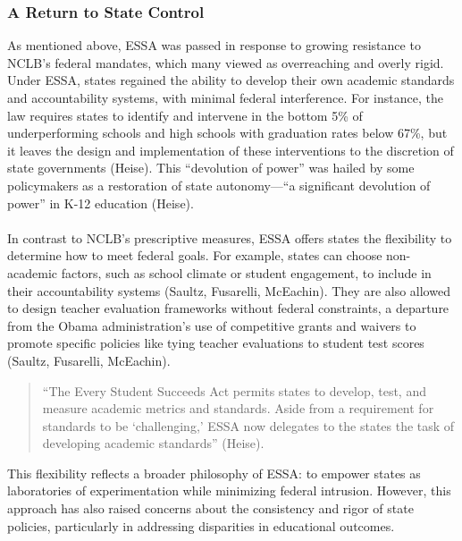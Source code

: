 \documentclass[11pt]{extarticle}
\begin{document}
\subsubsection{A Return to State Control}
As mentioned above, ESSA was passed in response to growing resistance to NCLB’s federal mandates, which many viewed as overreaching and overly rigid. 
Under ESSA, states regained the ability to develop their own academic standards and accountability systems, with minimal federal interference. 
For instance, the law requires states to identify and intervene in the bottom 5\% of underperforming schools and high schools with graduation rates below 67\%, but it leaves the design and implementation of these interventions to the discretion of state governments (Heise). 
This “devolution of power” was hailed by some policymakers as a restoration of state autonomy---“a significant devolution of power” in K-12 education (Heise).\\
\\
In contrast to NCLB’s prescriptive measures, ESSA offers states the flexibility to determine how to meet federal goals. 
For example, states can choose non-academic factors, such as school climate or student engagement, to include in their accountability systems (Saultz, Fusarelli, McEachin). They are also allowed to design teacher evaluation frameworks without federal constraints, a departure from the Obama administration’s use of competitive grants and waivers to promote specific policies like tying teacher evaluations to student test scores (Saultz, Fusarelli, McEachin).
\begin{quote}
  “The Every Student Succeeds Act permits states to develop, test, and measure academic metrics and standards. Aside from a requirement for standards to be ‘challenging,’ ESSA now delegates to the states the task of developing academic standards” (Heise).
\end{quote}
This flexibility reflects a broader philosophy of ESSA: to empower states as laboratories of experimentation while minimizing federal intrusion. However, this approach has also raised concerns about the consistency and rigor of state policies, particularly in addressing disparities in educational outcomes.
\end{document}
